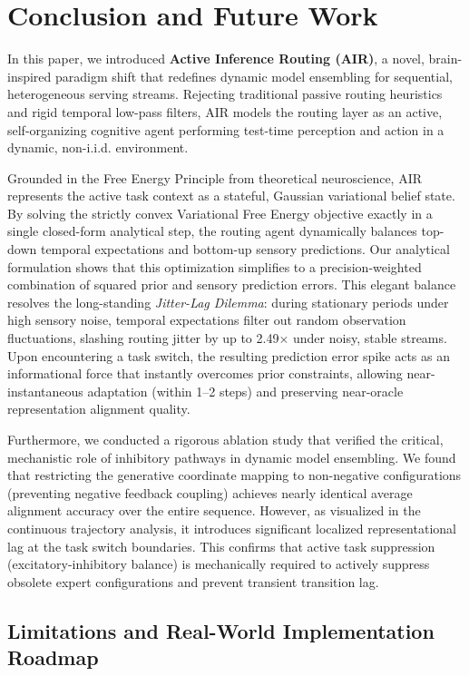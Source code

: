 \section{Conclusion and Future Work}
\label{sec:conclusion}

In this paper, we introduced \textbf{Active Inference Routing (AIR)}, a novel, brain-inspired paradigm shift that redefines dynamic model ensembling for sequential, heterogeneous serving streams. Rejecting traditional passive routing heuristics and rigid temporal low-pass filters, AIR models the routing layer as an active, self-organizing cognitive agent performing test-time perception and action in a dynamic, non-i.i.d. environment.

Grounded in the Free Energy Principle from theoretical neuroscience, AIR represents the active task context as a stateful, Gaussian variational belief state. By solving the strictly convex Variational Free Energy objective exactly in a single closed-form analytical step, the routing agent dynamically balances top-down temporal expectations and bottom-up sensory predictions. Our analytical formulation shows that this optimization simplifies to a precision-weighted combination of squared prior and sensory prediction errors. This elegant balance resolves the long-standing \emph{Jitter-Lag Dilemma}: during stationary periods under high sensory noise, temporal expectations filter out random observation fluctuations, slashing routing jitter by up to 2.49$\times$ under noisy, stable streams. Upon encountering a task switch, the resulting prediction error spike acts as an informational force that instantly overcomes prior constraints, allowing near-instantaneous adaptation (within 1--2 steps) and preserving near-oracle representation alignment quality.

Furthermore, we conducted a rigorous ablation study that verified the critical, mechanistic role of inhibitory pathways in dynamic model ensembling. We found that restricting the generative coordinate mapping to non-negative configurations (preventing negative feedback coupling) achieves nearly identical average alignment accuracy over the entire sequence. However, as visualized in the continuous trajectory analysis, it introduces significant localized representational lag at the task switch boundaries. This confirms that active task suppression (excitatory-inhibitory balance) is mechanically required to actively suppress obsolete expert configurations and prevent transient transition lag.

\subsection{Limitations and Real-World Implementation Roadmap}
\label{subsec:limitations_roadmap}



